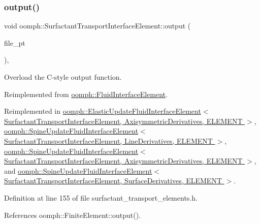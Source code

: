 \subsubsection{\texorpdfstring{output()}{output()}\hspace{0.1cm}{\footnotesize\ttfamily [3/4]}}
{\footnotesize\ttfamily void oomph\+::\+Surfactant\+Transport\+Interface\+Element\+::output (\begin{DoxyParamCaption}\item[{F\+I\+LE $\ast$}]{file\+\_\+pt }\end{DoxyParamCaption})\hspace{0.3cm}{\ttfamily [inline]}, {\ttfamily [virtual]}}



Overload the C-\/style output function. 



Reimplemented from \hyperlink{classoomph_1_1FluidInterfaceElement_ad39bb9862c7f76e07d5ac006a1209cf9}{oomph\+::\+Fluid\+Interface\+Element}.



Reimplemented in \hyperlink{classoomph_1_1ElasticUpdateFluidInterfaceElement_a8baae14bdede6a659e948942d7a08cb5}{oomph\+::\+Elastic\+Update\+Fluid\+Interface\+Element$<$ Surfactant\+Transport\+Interface\+Element, Axisymmetric\+Derivatives, E\+L\+E\+M\+E\+N\+T $>$}, \hyperlink{classoomph_1_1SpineUpdateFluidInterfaceElement_a963fdd8b603e563da9fb966e0c429457}{oomph\+::\+Spine\+Update\+Fluid\+Interface\+Element$<$ Surfactant\+Transport\+Interface\+Element, Line\+Derivatives, E\+L\+E\+M\+E\+N\+T $>$}, \hyperlink{classoomph_1_1SpineUpdateFluidInterfaceElement_a963fdd8b603e563da9fb966e0c429457}{oomph\+::\+Spine\+Update\+Fluid\+Interface\+Element$<$ Surfactant\+Transport\+Interface\+Element, Axisymmetric\+Derivatives, E\+L\+E\+M\+E\+N\+T $>$}, and \hyperlink{classoomph_1_1SpineUpdateFluidInterfaceElement_a963fdd8b603e563da9fb966e0c429457}{oomph\+::\+Spine\+Update\+Fluid\+Interface\+Element$<$ Surfactant\+Transport\+Interface\+Element, Surface\+Derivatives, E\+L\+E\+M\+E\+N\+T $>$}.



Definition at line 155 of file surfactant\+\_\+transport\+\_\+elements.\+h.



References oomph\+::\+Finite\+Element\+::output().

\mbox{\label{classoomph_1_1SurfactantTransportInterfaceElement_ad41354dbe1ae8291e3330b3752b525f8}} 
